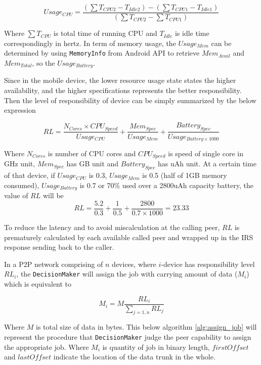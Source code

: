 \documentclass[conference]{IEEEtran}
\begin{document}
\begin{equation}
\label{eq:cpu_usage}
Usage_{CPU} = \frac{(\sum{T_{CPU2}} - T_{Idle2}) - (\sum{T_{CPU1}} - T_{Idle1})}{(\sum{T_{CPU2}} - \sum{T_{CPU1}})}
\end{equation}

Where $\sum{T_{CPU}}$ is total time of running CPU and $T_{Idle}$ is idle time correspondingly in hertz. In term of memory usage, the $Usage_{Mem}$ can be determined by using \texttt{MemoryInfo} from Android API to retrieve $Mem_{Avail}$ and $Mem_{Total}$, so the $Usage_{Battery}$.

Since in the mobile device, the lower resource usage state states the higher availability, and the higher specifications represents the better responsibility. Then the level of responsibility of device can be simply summarized by the below expression

\begin{equation}
\label{eq:res_level}
RL = \frac{N_{Cores} \times CPU_{Speed}}{Usage_{CPU}} + \frac{Mem_{Spec}}{Usage_{Mem}} + \frac{Battery_{Spec}}{Usage_{Battery \times 1000}}
\end{equation}

Where $N_{Cores}$ is number of CPU cores and $CPU_{Speed}$ is speed of single core in GHz unit, $Mem_{Spec}$ has GB unit and $Battery_{Spec}$ has uAh unit. At a certain time of that device, if $Usage_{CPU}$ is 0.3, $Usage_{Mem}$ is 0.5 (half of 1GB memory consumed), $Usage_{Battery}$ is 0.7 or 70\% used over a 2800uAh capacity battery, the value of $RL$ will be
$$RL = \frac{5.2}{0.3} + \frac{1}{0.5} + \frac{2800}{0.7 \times 1000} = 23.33$$

To reduce the latency and to avoid miscalculation at the calling peer, $RL$ is prematurely calculated by each available called peer and wrapped up in the IRS response sending back to the caller. 

In a P2P network comprising of $n$ devices, where $i$-device has responsibility level $RL_{i}$, the \texttt{DecisionMaker} will assign the job with carrying amount of data ($M_{i}$) which is equivalent to

\begin{equation} 
\label{eq:data_amount}
M_{i} = M\frac{RL_{i}}{\sum_{j = \overline{1,n}}{RL_{j}}}
\end{equation}

Where $M$ is total size of data in bytes. This below algorithm \ref{alg:assign_job} will represent the procedure that \texttt{DecisionMaker} judge the peer capability to assign the appropriate job. Where $M_{i}$ is quantity of job in binary length, $firstOffset$ and $lastOffset$ indicate the location of the data trunk in the whole.
\end{document}
